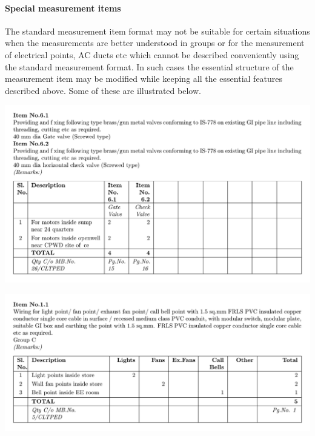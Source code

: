 \documentclass[twoside,a4paper]{refart}
\newenvironment{fminipage}[1]%
{\begin{Sbox}\begin{minipage}{#1}\begin{center}}%
		{\end{center}\end{minipage}\end{Sbox}\shadowbox{\TheSbox}}
\begin{document}
	 \paragraph{Special measurement items}
	 
	 The standard measurement item format may not be suitable for certain situations when the measurements are better understood in groups or for the measurement of electrical points, AC ducts etc which cannot be described conveniently using the standard measurement format. In such cases the essential structure of the measurement item may be modified while keeping all the essential features described above. Some of these are illustrated below.
	 
	 \begin{center}
	 	\begin{fminipage}{\textwidth}
	 		\includegraphics[width=1\linewidth]{figures/measurementNNNNNN.pdf}
	 	\end{fminipage}
	 \end{center}
	 
	 \begin{center}
	 	\begin{fminipage}{\textwidth}
	 		\includegraphics[width=1\linewidth]{figures/measurement_points.pdf}
	 	\end{fminipage}
	 \end{center}
	 
\end{document}
